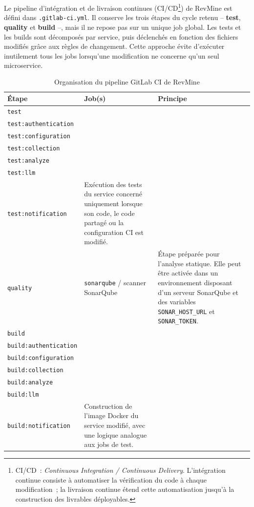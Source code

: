Le pipeline d'intégration et de livraison continues (CI/CD\footnote{CI/CD~: \textit{Continuous
Integration / Continuous Delivery}. L'intégration continue consiste à automatiser la vérification
du code à chaque modification~; la livraison continue étend cette automatisation jusqu'à la
construction des livrables déployables.}) de RevMine est défini dans \texttt{.gitlab-ci.yml}. Il
conserve les trois étapes du cycle retenu -- \textbf{test}, \textbf{quality} et \textbf{build} --,
mais il ne repose pas sur un unique job global. Les tests et les builds sont décomposés par
service, puis déclenchés en fonction des fichiers modifiés grâce aux règles de changement. Cette
approche évite d'exécuter inutilement tous les jobs lorsqu'une modification ne concerne qu'un seul
microservice.

\begin{table}[H]
\centering
\small
\caption{Organisation du pipeline GitLab CI de RevMine}
\label{tab:pipeline-ci}
\begin{tabular}{|>{\raggedright\arraybackslash}p{2cm}
                |>{\raggedright\arraybackslash}p{5.2cm}
                |>{\raggedright\arraybackslash}p{6cm}|}
\hline
\textbf{Étape} & \textbf{Job(s)} & \textbf{Principe} \\
\hline
\texttt{test} & \makecell[l]{\texttt{test:api-gateway} \\ \texttt{test:authentication} \\ \texttt{test:configuration} \\ \texttt{test:collection} \\ \texttt{test:analyze} \\ \texttt{test:llm} \\ \texttt{test:notification}} & Exécution des tests du service concerné uniquement lorsque son code, le code partagé ou la configuration CI est modifié. \\
\hline
\texttt{quality} & \texttt{sonarqube} / scanner SonarQube & Étape préparée pour l'analyse statique. Elle peut être activée dans un environnement disposant d'un serveur SonarQube et des variables \texttt{SONAR\_HOST\_URL} et \texttt{SONAR\_TOKEN}. \\
\hline
\texttt{build} & \makecell[l]{\texttt{build:api-gateway} \\ \texttt{build:authentication} \\ \texttt{build:configuration} \\ \texttt{build:collection} \\ \texttt{build:analyze} \\ \texttt{build:llm} \\ \texttt{build:notification}} & Construction de l'image Docker du service modifié, avec une logique analogue aux jobs de test. \\
\hline
\end{tabular}
\end{table}

